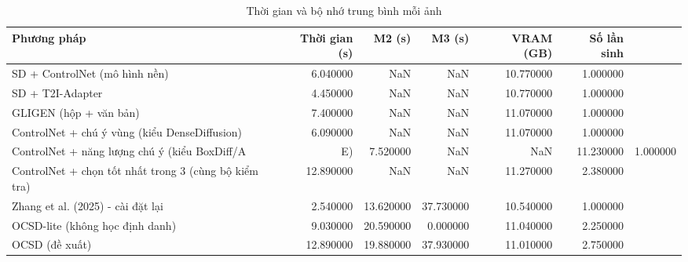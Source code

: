 \begin{table}
\caption{Thời gian và bộ nhớ trung bình mỗi ảnh}
\begin{tabular}{lrrrrr}
\toprule
Phương pháp & Thời gian (s) & M2 (s) & M3 (s) & VRAM (GB) & Số lần sinh \\
\midrule
SD + ControlNet (mô hình nền) & 6.040000 & NaN & NaN & 10.770000 & 1.000000 \\
SD + T2I-Adapter & 4.450000 & NaN & NaN & 10.770000 & 1.000000 \\
GLIGEN (hộp + văn bản) & 7.400000 & NaN & NaN & 11.070000 & 1.000000 \\
ControlNet + chú ý vùng (kiểu DenseDiffusion) & 6.090000 & NaN & NaN & 11.070000 & 1.000000 \\
ControlNet + năng lượng chú ý (kiểu BoxDiff/A&E) & 7.520000 & NaN & NaN & 11.230000 & 1.000000 \\
ControlNet + chọn tốt nhất trong 3 (cùng bộ kiểm tra) & 12.890000 & NaN & NaN & 11.270000 & 2.380000 \\
Zhang et al. (2025) - cài đặt lại & 2.540000 & 13.620000 & 37.730000 & 10.540000 & 1.000000 \\
OCSD-lite (không học định danh) & 9.030000 & 20.590000 & 0.000000 & 11.040000 & 2.250000 \\
OCSD (đề xuất) & 12.890000 & 19.880000 & 37.930000 & 11.010000 & 2.750000 \\
\bottomrule
\end{tabular}
\end{table}
